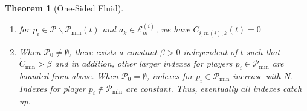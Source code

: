 \documentclass{article}
\newcommand{\UMA}{\mathcal{A}^{\texttt{UM}}}
\newtheorem{theorem}{Theorem}
\begin{document}
\begin{theorem}[One-Sided Fluid]
\begin{enumerate}[leftmargin=*, nosep,noitemsep, topsep=0pt]
        \item for $p_{i}\in\mathcal{P}\backslash\mathcal{P}_{\min}(t)$ and $a_{k}\in\mathcal{E}_{m}^{(i)}$, we have $\dot{C}_{i,m(i),k}(t)=0$

\item When $\mathcal{P}_{0}\neq \emptyset$, there exists a constant $\beta>0$ independent of $t$ such that $\dot{C}_{\min}>\beta$ and in addition, other larger indexes for players $p_i\in\mathcal{P}_{\min}$ are bounded from above. 
When $\mathcal{P}_{0}= \emptyset$, indexes for $p_i\in\mathcal{P}_{\min}$ increase with $N$. Indexes for player $p_i\not\in\mathcal{P}_{\min}$ are constant. Thus, eventually all indexes catch up. 
\end{enumerate}
\end{theorem}
\end{document}
